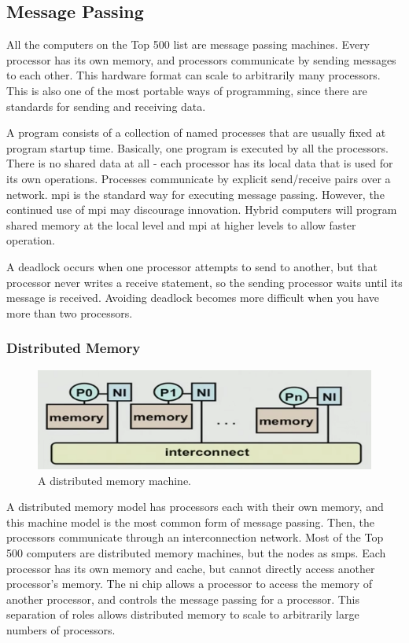 \documentclass[10pt]{article}
\begin{document}
\begin{flushleft}
\subsection{Message Passing}

All the computers on the Top 500 list are message passing machines. Every processor has its own memory, and processors communicate by sending messages to each other. This hardware format can scale to arbitrarily many processors. This is also one of the most portable ways of programming, since there are standards for sending and receiving data.

A program consists of a collection of named processes that are usually fixed at program startup time. Basically, one program is executed by all the processors. There is no shared data at all - each processor has its local data that is used for its own operations. Processes communicate by explicit send/receive pairs over a network. \gls{mpi} is the standard way for executing message passing. However, the continued use of \gls{mpi} may discourage innovation. Hybrid computers will program shared memory at the local level and \gls{mpi} at higher levels to allow faster operation.

A deadlock occurs when one processor attempts to send to another, but that processor never writes a receive statement, so the sending processor waits until its message is received. Avoiding deadlock becomes more difficult when you have more than two processors. 

\subsubsection{Distributed Memory}

\begin{figure}[H]
\centering
\includegraphics[width=0.5\linewidth]{figures/distributed-memory.pdf}
\caption{A distributed memory machine.}
\end{figure}

A distributed memory model has processors each with their own memory, and this machine model is the most common form of message passing. Then, the processors communicate through an interconnection network. Most of the Top 500 computers are distributed memory machines, but the nodes as \gls{smp}s. Each processor has its own memory and cache, but cannot directly access another processor's memory. The \gls{ni} chip allows a processor to access the memory of another processor, and controls the message passing for a processor. This separation of roles allows distributed memory to scale to arbitrarily large numbers of processors.


\end{flushleft}
\end{document}
